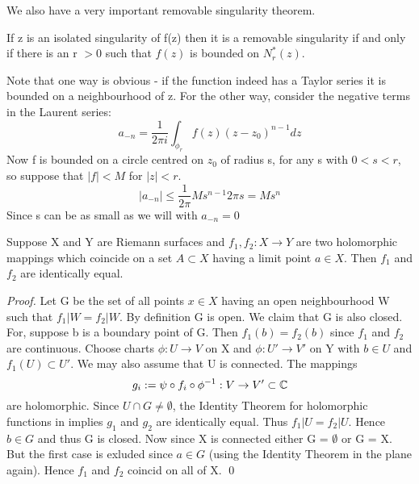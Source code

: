 We also have a very important removable singularity theorem.
\begin{thm}
If z is an isolated singularity of f(z) then it is a removable singularity if and only if there is an r $\gt 0$ such that
$f(z)$ is bounded on $N^*_{r}(z)$.
 
\end{thm}
\begin{rem}
 Note that one way is obvious - if the function indeed has a Taylor series it is bounded on a neighbourhood of z.
For the other way, consider the negative terms in the Laurent series: 
\begin{equation}
 a_{-n} = \dfrac{1}{2\pi i} \int_{\phi_{r}} f(z) (z-z_{0})^{n-1} dz
\end{equation}
 Now f is bounded on a circle centred on $z_{0}$ of radius s, for any s with $0 \lt s \lt r$, so 
suppose that $|f| \lt M$ for $|z| \lt r.$
\begin{equation}
 |a_{-n}| \leq \dfrac{1}{2\pi}M s^{n-1} 2 \pi s = Ms^{n}
\end{equation}
Since s can be as small as we will with $a_{-n} = 0$
\end{rem}
\begin{thm}
 Suppose X and Y are Riemann surfaces and $f_{1}, f_{2}: X \to Y$ are two holomorphic mappings which coincide on a
set $A \subset X$ having a limit point $a \in X$. Then $f_1$ and $f_2$ are identically equal. 
\end{thm}
\begin{proof}
 Let G be the set of all points $x \in X$ having an open neighbourhood W such that $f_1|W= f_2|W$. By definition 
G is open. We claim that G is also closed. For, suppose b is a boundary point of G. Then $f_1(b) = f_2(b)$ since 
$f_1$ and $f_2$ are continuous. Choose charts $\phi: U \to V$ on X and $\phi:U' \to V'$ on Y with $b \in U$ and 
$f_1(U) \subset U'$. We may also assume that U is connected. The mappings
\begin{equation}
 g_{i} := \psi \circ f_i \circ \phi^{-1} : V \to V' \subset \mathbb{C}
\end{equation}
are holomorphic. Since $U \cap G \neq \emptyset$, the Identity Theorem for holomorphic functions in \Cbb \; implies $g_1$
and $g_2$ are identically equal. Thus $f_1|U = f_2|U$. Hence $b\in G$ and thus G is closed. Now since X is connected
either G = $\emptyset$ or G = X. But the first case is exluded since $a \in G$ (using the Identity Theorem in the plane 
again). Hence $f_1$ and $f_2$ coincid on all of X. \qed
\end{proof} 
